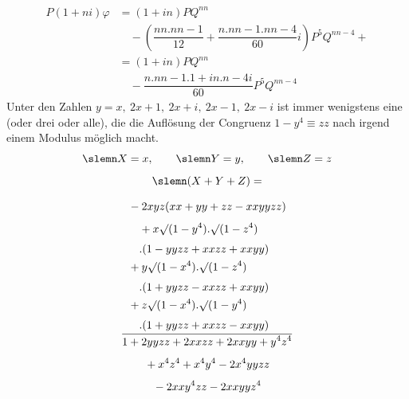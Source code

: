 \[
\begin{aligned}
P(1+ni)\varphi
 &= (1+in)PQ^{nn}
 \\[5pt]&\quad{}-\left(\dfrac{nn.nn-1}{12}+\dfrac{n.nn-1.nn-4}{60}i\right)P^5Q^{nn-4}+{}\\[7pt]
 &= (1+in)PQ^{nn}\\[5pt]&\quad{}-\dfrac{n.nn-1.1+in.n-4i}{60}P^5Q^{nn-4}
\end{aligned}
\]
Unter den Zahlen $y=x,\ 2x+1,\ 2x+i,\ 2x-1,\ 2x-i$ ist immer wenigstens eine (oder drei oder alle), die die Auflösung der Congruenz $1-y^4\equiv zz$ nach irgend einem Modulus möglich macht.
\[
\slemn X=x,\qquad \slemn Y=y,\qquad \slemn Z=z
\]
\[
\begin{gathered}\slemn(X+Y+Z)=\\[7pt]
\dfrac{\begin{aligned}
 &-2xyz(xx+yy+zz-xxyyzz)\\[4pt]&\quad{}+x\surd(1-y^4).\surd(1-z^4)\\[3pt]&\quad{}.(1-yyzz+xxzz+xxyy)\\
 &+y\surd(1-x^4).\surd(1-z^4)\\[3pt]&\quad{}.(1+yyzz-xxzz+xxyy)\\
 &+z\surd(1-x^4).\surd(1-y^4)\\[3pt]&\quad{}.(1+yyzz+xxzz-xxyy)
\end{aligned}}{\begin{gathered}1+2yyzz+2xxzz+2xxyy+y^4z^4\\[4pt]{}+x^4z^4+x^4y^4-2x^4yyzz\\[4pt]{}-2xxy^4zz-2xxyyz^4\end{gathered}}\end{gathered}
\]

